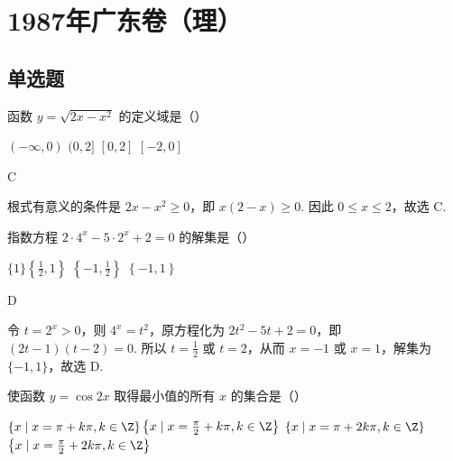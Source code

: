 \documentclass[UTF8,a4paper,oneside,11pt]{ctexbook}
\begin{document}
\mainmatter

\chapter{1987年广东卷（理）}

\section{单选题}

\begin{problem}

函数 \(y = \sqrt{2x - x^2} \) 的定义域是（\quad）

\choices
{\((- \infty, 0) \)}
{\((0, 2] \)}
{\([0, 2] \)}
{\([-2, 0] \)}
\end{problem}

\begin{answer}
C
\end{answer}

\begin{solution}
根式有意义的条件是 \(2x-x^{2}\geqslant0\)，即 \(x(2-x)\geqslant0\). 因此 \(0\leqslant x\leqslant2\)，故选 C.
\end{solution}

\begin{problem}

指数方程 \(2\cdot 4^{x} - 5\cdot 2^{x} + 2 = 0 \) 的解集是（\quad）

\choices
{\(\{1\} \)}{\(\left\{ \frac{1}{2}, 1 \right\} \)}
{\(\left\{ -1, \frac{1}
{2} \right\} \)}
{\(\left\{ -1, 1 \right\} \)}
\end{problem}

\begin{answer}
D
\end{answer}

\begin{solution}
令 \(t=2^{x}>0\)，则 \(4^{x}=t^{2}\)，原方程化为 \(2t^{2}-5t+2=0\)，即 \((2t-1)(t-2)=0\). 所以 \(t=\frac{1}{2}\) 或 \(t=2\)，从而 \(x=-1\) 或 \(x=1\)，解集为 \(\{-1,1\}\)，故选 D.
\end{solution}

\begin{problem}

使函数 \(y = \cos 2x \) 取得最小值的所有 \(x \) 的集合是（\quad）

\choices
{\(\{x \mid x = \pi + k\pi, k \in \Z\} \)}{\(\left\{x \mid x = \frac{\pi}{2} + k\pi, k \in \Z\right\} \)}
{\(\{x \mid x = \pi + 2k\pi, k \in \Z\} \)}
{\(\left\{x \mid x = \frac{\pi}
{2} + 2k\pi, k \in \Z\right\} \)}
\end{problem}
\end{document}
